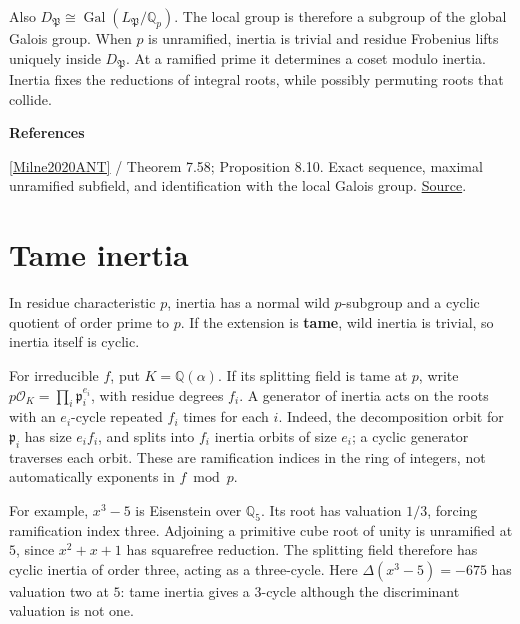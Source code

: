 \documentclass[11pt,a4paper,oneside,openany]{book}
\newcommand{\atlasdisplay}[1]{\par\begingroup\centering\vspace{3pt}\noindent\adjustbox{max width=\linewidth}{\(\displaystyle #1\)}\par\vspace{5pt}\endgroup}
\newenvironment{sources}{\par\smallskip\begingroup\footnotesize\color{atlasgray}\leftskip=10pt\setlength{\parskip}{2pt}}{\par\endgroup\smallskip}
\begin{document}
\atlasdisplay{1\longrightarrow I_{\mathfrak P}\longrightarrow D_{\mathfrak P}\longrightarrow\operatorname{Gal}(k_{\mathfrak P}/\mathbb F_p)\longrightarrow1.}
\color{black} Also \(D_{\mathfrak P}\cong\operatorname{Gal}(L_{\mathfrak P}/\mathbb Q_p)\). The local group is therefore a subgroup of the global Galois group. When \(p\) is unramified, inertia is trivial and residue Frobenius lifts uniquely inside \(D_{\mathfrak P}\). At a ramified prime it determines a coset modulo inertia. Inertia fixes the reductions of integral roots, while possibly permuting roots that collide.\par
\begin{sources}
\textbf{References}\par\smallskip
\noindent\hyperlink{ref:Milne2020ANT}{[Milne2020ANT]} / Theorem 7.58; Proposition 8.10. Exact sequence, maximal unramified subfield, and identification with the local Galois group. \href{https://www.jmilne.org/math/CourseNotes/ANT.pdf}{Source}.\par
\end{sources}\color{black}
\section{Tame inertia}
\color{black} In residue characteristic \(p\), inertia has a normal wild \(p\)-subgroup and a cyclic quotient of order prime to \(p\). If the extension is \textbf{tame}, wild inertia is trivial, so inertia itself is cyclic.\par
\color{black} For irreducible \(f\), put \(K=\mathbb Q(\alpha)\). If its splitting field is tame at \(p\), write \(p\mathcal O_K=\prod_i\mathfrak p_i^{e_i}\), with residue degrees \(f_i\). A generator of inertia acts on the roots with an \(e_i\)-cycle repeated \(f_i\) times for each \(i\). Indeed, the decomposition orbit for \(\mathfrak p_i\) has size \(e_if_i\), and splits into \(f_i\) inertia orbits of size \(e_i\); a cyclic generator traverses each orbit. These are ramification indices in the ring of integers, not automatically exponents in \(f\bmod p\).\par
\color{black} For example, \(x^3-5\) is Eisenstein over \(\mathbb Q_5\). Its root has valuation \(1/3\), forcing ramification index three. Adjoining a primitive cube root of unity is unramified at \(5\), since \(x^2+x+1\) has squarefree reduction. The splitting field therefore has cyclic inertia of order three, acting as a three-cycle. Here \(\Delta(x^3-5)=-675\) has valuation two at \(5\): tame inertia gives a 3-cycle although the discriminant valuation is not one.\par
\end{document}
